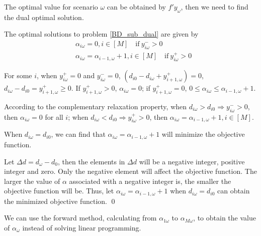The optimal value for scenario $\omega$ can be obtained by $f{'} y_{\omega}$, then we need to find the dual optimal solution.


\begin{thm}\label{optimal_sol_sub_dual}
  The optimal solutions to problem \eqref{BD_sub_dual} are given by 
\begin{equation}\label{BD_sub_simplified}
  \begin{aligned}
    & \alpha_{i \omega} =0, i \in [M] \quad \text{if}~  y_{i \omega}^{-} > 0   \\
    & \alpha_{i \omega} = \alpha_{i-1, \omega}+1, i \in [M] \quad \text{if}~ y_{i \omega}^{+} > 0
  \end{aligned}
\end{equation}
\end{thm}

For some $i$, when $y_{i \omega}^{+} = 0$ and $y_{i \omega}^{-} = 0$, $\left(d_{i 0}- d_{i \omega} + y_{i+1, \omega}^{+}\right) = 0$, $d_{i \omega}- d_{i 0} = y_{i+1, \omega}^{+} \geq 0$.
If $y_{i+1, \omega}^{+} > 0$, $\alpha_{i \omega} = 0$;
if $y_{i+1, \omega}^{+} = 0$, $0 \leq \alpha_{i \omega} \leq \alpha_{i-1, \omega} +1$.

\begin{pf}
  According to the complementary relaxation property, when
$d_{i \omega} > d_{i 0} \Rightarrow y_{i \omega}^{-} >0$, then $\alpha_{i \omega} =0$ for all $i$; when $d_{i \omega} < d_{i 0} \Rightarrow y_{i \omega}^{+} >0$, then $\alpha_{i \omega} = \alpha_{i-1,\omega} +1, i \in [M]$. 

When $d_{i \omega} = d_{i 0}$,  we can find that $\alpha_{i \omega} = \alpha_{i-1, \omega} + 1$ will minimize the objective function.

Let $\Delta d = d_{\omega} - d_0$, then the elements in $\Delta d$ will be a negative integer, positive integer and zero. 
Only the negative element will affect the objective function.
The larger the value of $\alpha$ associated with a negative integer is, the smaller the objective function will be. Thus, let $\alpha_{i \omega} = \alpha_{i-1, \omega} + 1$ when $d_{i \omega} = d_{i 0}$ can obtain the minimized objective function.
\qed
\end{pf}

We can use the forward method, calculating from $\alpha_{1 \omega}$ to $\alpha_{M \omega}$, to obtain the value of $\alpha_{\omega}$ instead of solving linear programming.

